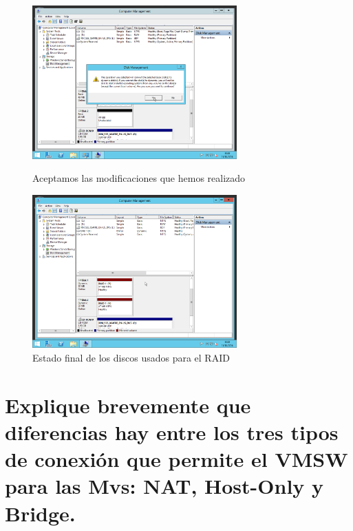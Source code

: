 \begin{figure}[H]
	\begin{center}
		\includegraphics[width=0.7\textwidth]{Imagenes/09_Aceptar-las-modificaciones}
		\caption{Aceptamos las modificaciones que hemos realizado} \label{fig:figura19}
		
		\includegraphics[width=0.7\textwidth]{Imagenes/10_Estado-final-de-ambos-volumenes}
		\caption{Estado final de los discos usados para el RAID} \label{fig:figura20}
	\end{center}
\end{figure}

\section{Explique brevemente que diferencias hay entre los tres tipos de conexión que permite el VMSW para las Mvs: NAT, Host-Only y Bridge.}
